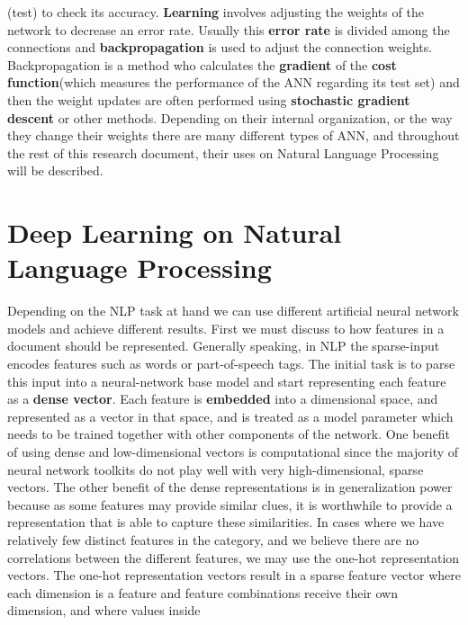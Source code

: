\documentclass{scrartcl}
\begin{document}
    (test) to check its accuracy. 
    \textbf{Learning} involves adjusting the weights of the network 
    to decrease an error rate. Usually this \textbf{error rate} is divided among the connections and 
    \textbf{backpropagation} is used to adjust the connection weights. Backpropagation is a method
    who calculates the \textbf{gradient} of the \textbf{cost function}(which measures the performance
    of the ANN regarding its test set) and then the weight updates are often performed using
    \textbf{stochastic gradient descent} or other methods.
    Depending on their internal organization, or the way they change their weights there are many
    different types of ANN, and throughout the rest of this research document, their uses on
    Natural Language Processing will be described.
    \section{ Deep Learning on Natural Language Processing }
    Depending on the NLP task at hand we can use different artificial neural network models and
    achieve different results.
    First we must discuss to how features in a document should be represented. \newline
    Generally speaking, in NLP the sparse-input encodes features such as words
    or part-of-speech tags. The initial task is to parse this input into a neural-network
    base model and start representing each feature as a \textbf{dense vector}. 
    Each feature is \textbf{embedded} into a dimensional space, and represented as a vector in 
    that space, and is treated as a model parameter which needs to be trained together 
    with other components of the network.
    One benefit of using dense and low-dimensional vectors is computational since
    the majority of neural network toolkits do not play well with very high-dimensional, sparse  
    vectors. The other benefit of the dense representations is in generalization power because 
    as some features may provide similar clues, it is worthwhile to provide a representation that
    is able to capture these similarities. \newline
    In cases where we have relatively few distinct features in the category, and we believe
    there are no correlations between the different features,
    we may use the one-hot representation vectors.
    The one-hot representation vectors result in a sparse feature vector where each dimension
    is a feature and feature combinations receive their own dimension, and where values inside
\end{document}
